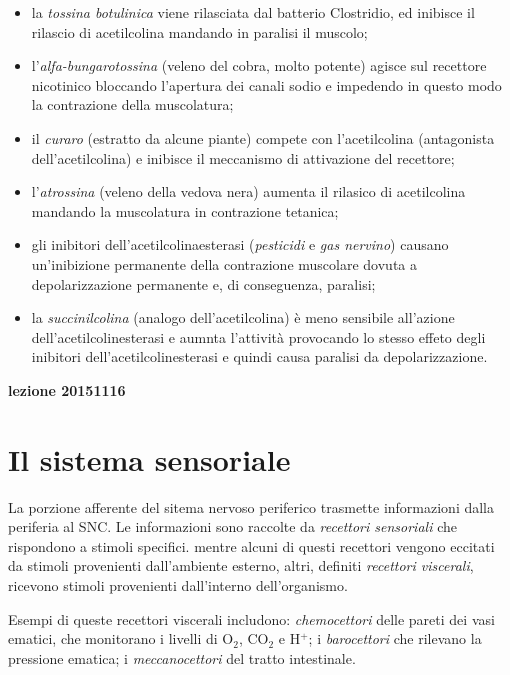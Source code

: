 \documentclass[]{article}
\begin{document}
\begin{itemize}
\itemsep1pt\parskip0pt
\item
  la \emph{tossina botulinica} viene rilasciata dal batterio Clostridio,
  ed inibisce il rilascio di acetilcolina mandando in paralisi il
  muscolo;
\item
  l'\emph{alfa-bungarotossina} (veleno del cobra, molto potente) agisce
  sul recettore nicotinico bloccando l'apertura dei canali sodio e
  impedendo in questo modo la contrazione della muscolatura;
\item
  il \emph{curaro} (estratto da alcune piante) compete con
  l'acetilcolina (antagonista dell'acetilcolina) e inibisce il
  meccanismo di attivazione del recettore;
\item
  l'\emph{atrossina} (veleno della vedova nera) aumenta il rilasico di
  acetilcolina mandando la muscolatura in contrazione tetanica;
\item
  gli inibitori dell'acetilcolinaesterasi (\emph{pesticidi} e \emph{gas
  nervino}) causano un'inibizione permanente della contrazione muscolare
  dovuta a depolarizzazione permanente e, di conseguenza, paralisi;
\item
  la \emph{succinilcolina} (analogo dell'acetilcolina) è meno sensibile
  all'azione dell'acetilcolinesterasi e aumnta l'attività provocando lo
  stesso effeto degli inibitori dell'acetilcolinesterasi e quindi causa
  paralisi da depolarizzazione.
\end{itemize}

\textbf{lezione 20151116}

\section{Il sistema sensoriale}\label{il-sistema-sensoriale}

La porzione afferente del sitema nervoso periferico trasmette
informazioni dalla periferia al SNC. Le informazioni sono raccolte da
\emph{recettori sensoriali} che rispondono a stimoli specifici. mentre
alcuni di questi recettori vengono eccitati da stimoli provenienti
dall'ambiente esterno, altri, definiti \emph{recettori viscerali},
ricevono stimoli provenienti dall'interno dell'organismo.

Esempi di queste recettori viscerali includono: \emph{chemocettori}
delle pareti dei vasi ematici, che monitorano i livelli di O\(_2\),
CO\(_2\) e H\(^+\); i \emph{barocettori} che rilevano la pressione
ematica; i \emph{meccanocettori} del tratto intestinale.
\end{document}
